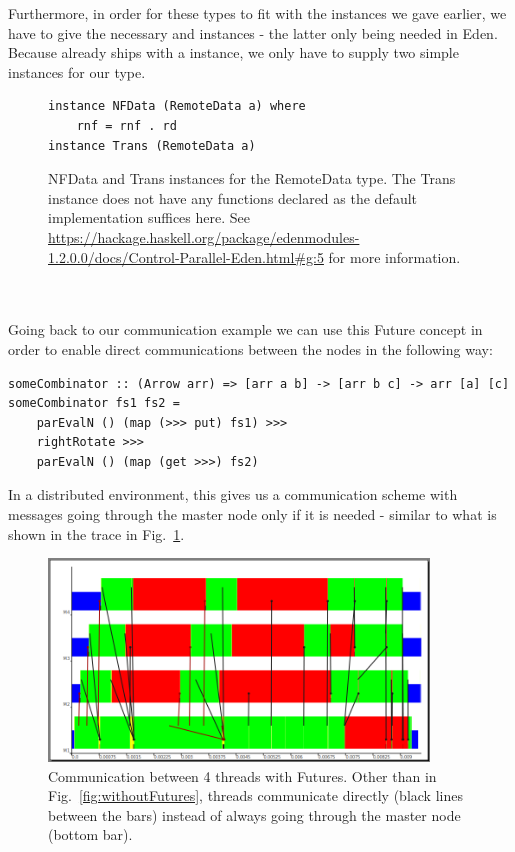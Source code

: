 Furthermore, in order for these  types to fit with the  instances we gave earlier, we have to give the necessary  and  instances - the latter only being needed in Eden. Because  already ships with a  instance, we only have to supply two simple instances for our  type.
\begin{figure}[h]
\begin{lstlisting}[frame=htrbl]
instance NFData (RemoteData a) where
    rnf = rnf . rd
instance Trans (RemoteData a)
\end{lstlisting}
\caption{NFData and Trans instances for the RemoteData type. The Trans instance does not have any functions declared as the default implementation suffices here. See \url{https://hackage.haskell.org/package/edenmodules-1.2.0.0/docs/Control-Parallel-Eden.html\#g:5} for more information.}
\end{figure}
\\\\
Going back to our communication example we can use this Future concept in order to enable direct communications between the nodes in the following way:
\begin{lstlisting}[frame=htrbl]
someCombinator :: (Arrow arr) => [arr a b] -> [arr b c] -> arr [a] [c]
someCombinator fs1 fs2 =
	parEvalN () (map (>>> put) fs1) >>>
	rightRotate >>>
	parEvalN () (map (get >>>) fs2)
\end{lstlisting}
In a distributed environment, this gives us a communication scheme with messages going through the master node only if it is needed - similar to what is shown in the trace in Fig.~\ref{fig:withFutures}.
\begin{figure}[ht]
	\centering
	\includegraphics[width=0.9\textwidth]{images/withFutures}
	\caption[with Futures]{Communication between 4 threads with Futures. Other than in Fig.~\ref{fig:withoutFutures}, threads communicate directly (black lines between the bars) instead of always going through the master node (bottom bar).}
	\label{fig:withFutures}
\end{figure}